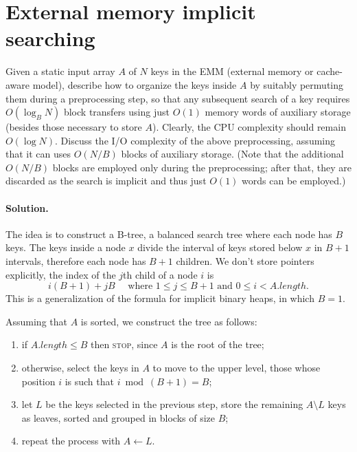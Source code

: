 \section{External memory implicit searching}
Given a static input array $A$ of $N$ keys in the EMM (external memory or cache-aware model), describe how to organize the keys inside $A$ by suitably permuting them during a preprocessing step, so that any subsequent search of a key requires $O(\log_B N)$ block transfers using just $O(1)$ memory words of auxiliary storage (besides those necessary to store $A$). Clearly, the CPU complexity should remain $O(\log N)$. Discuss the I/O complexity of the above preprocessing, assuming that it can uses $O(N/B)$ blocks of auxiliary storage. (Note that the additional $O(N/B)$ blocks are employed only during the preprocessing; after that, they are discarded as the search is implicit and thus just $O(1)$ words can be employed.)

\vspace{0.5cm}
\paragraph{Solution.} The idea is to construct a B-tree, a balanced search tree where each node has $B$ keys. The keys inside a node $x$ divide the interval of keys stored below $x$ in $B+1$ intervals, therefore each node has $B+1$ children. We don't store pointers explicitly, the index of the $j$th child of a node $i$ is
$$i(B+1)+jB \quad \text{ where } 1 \leq j \leq B+1 \text{ and } 0 \leq i < A.length.$$
This is a generalization of the formula for implicit binary heaps, in which $B=1$.

Assuming that $A$ is sorted, we construct the tree as follows:
\begin{enumerate}
  \item if $A.length \leq B$ then \textsc{stop}, since $A$ is the root of the tree;
  \item otherwise, select the keys in $A$ to move to the upper level, those whose position $i$ is such that $i \bmod (B+1) = B$;
  \item let $L$ be the keys selected in the previous step, store the remaining $A \setminus L$ keys as leaves, sorted and grouped in blocks of size $B$;
  \item repeat the process with $A \gets L$.
\end{enumerate}

